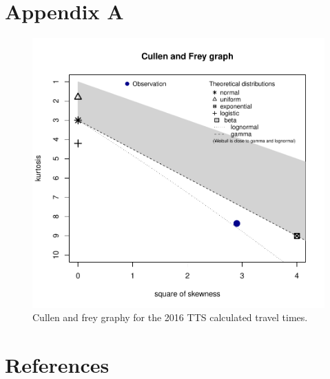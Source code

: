 \documentclass[]{elsarticle} %
\begin{document}
\hypertarget{appendix-a}{%
\section{Appendix A}\label{appendix-a}}

\begin{figure}

{\centering \includegraphics[width=1\linewidth]{Spatial-Availability_files/figure-latex/plot-cullen-frey-1} 

}

\caption{\label{fig:plot-cullen-frey}Cullen and frey graphy for the 2016 TTS calculated travel times.}\label{fig:plot-cullen-frey}
\end{figure}

\hypertarget{references}{%
\section*{References}\label{references}}
\end{document}
